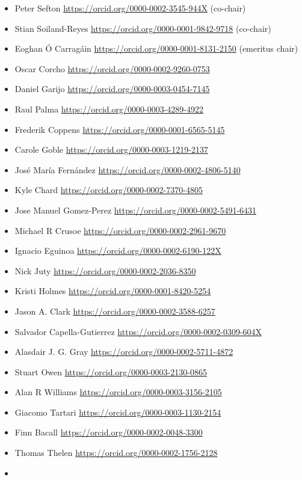\begin{itemize}
\tightlist
\item
  Peter Sefton \url{https://orcid.org/0000-0002-3545-944X} (co-chair)
\item
  Stian Soiland-Reyes \url{https://orcid.org/0000-0001-9842-9718}
  (co-chair)
\item
  Eoghan Ó Carragáin \url{https://orcid.org/0000-0001-8131-2150}
  (emeritus chair)
\item
  Oscar Corcho \url{https://orcid.org/0000-0002-9260-0753}
\item
  Daniel Garijo \url{https://orcid.org/0000-0003-0454-7145}
\item
  Raul Palma \url{https://orcid.org/0000-0003-4289-4922}
\item
  Frederik Coppens \url{https://orcid.org/0000-0001-6565-5145}
\item
  Carole Goble \url{https://orcid.org/0000-0003-1219-2137}
\item
  José María Fernández \url{https://orcid.org/0000-0002-4806-5140}
\item
  Kyle Chard \url{https://orcid.org/0000-0002-7370-4805}
\item
  Jose Manuel Gomez-Perez \url{https://orcid.org/0000-0002-5491-6431}
\item
  Michael R Crusoe \url{https://orcid.org/0000-0002-2961-9670}
\item
  Ignacio Eguinoa \url{https://orcid.org/0000-0002-6190-122X}
\item
  Nick Juty \url{https://orcid.org/0000-0002-2036-8350}
\item
  Kristi Holmes \url{https://orcid.org/0000-0001-8420-5254}
\item
  Jason A. Clark \url{https://orcid.org/0000-0002-3588-6257}
\item
  Salvador Capella-Gutierrez \url{https://orcid.org/0000-0002-0309-604X}
\item
  Alasdair J. G. Gray \url{https://orcid.org/0000-0002-5711-4872}
\item
  Stuart Owen \url{https://orcid.org/0000-0003-2130-0865}
\item
  Alan R Williams \url{https://orcid.org/0000-0003-3156-2105}
\item
  Giacomo Tartari \url{https://orcid.org/0000-0003-1130-2154}
\item
  Finn Bacall \url{https://orcid.org/0000-0002-0048-3300}
\item
  Thomas Thelen \url{https://orcid.org/0000-0002-1756-2128}
\item

\end{itemize}
